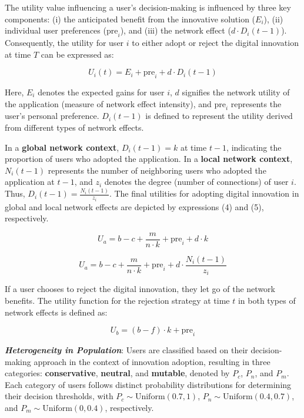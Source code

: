 \documentclass{article} %
\begin{document}
The utility value influencing a user’s decision-making is influenced by three key components: (i) the anticipated benefit from the innovative solution (\( E_i \)), (ii) individual user preferences (\( \text{pre}_i \)), and (iii) the network effect (\(d \cdot D_i(t - 1) \)). Consequently, the utility for user \( i \) to either adopt or reject the digital innovation at time \( T \) can be expressed as:

\begin{equation}
U_i(t) = E_i + \text{pre}_i + d \cdot D_i(t - 1)
\end{equation}

Here, \( E_i \) denotes the expected gains for user \( i \), \( d \) signifies the network utility of the application (measure of network effect intensity), and \( \text{pre}_i \) represents the user's personal preference. \( D_i(t - 1) \) is defined to represent the utility derived from different types of network effects. 

In a \textbf{global network context}, \( D_i(t - 1) = k \) at time \( t - 1 \), indicating the proportion of users who adopted the application. In a \textbf{local network context}, \( N_i(t - 1) \) represents the number of neighboring users who adopted the application at \( t - 1 \), and \( z_i \) denotes the degree (number of connections) of user \( i \). Thus, \( D_i(t - 1) = \frac{N_i(t - 1)}{z_i} \). The final utilities for adopting digital innovation in global and local network effects are depicted by expressions (4) and (5), respectively. 

\begin{equation}
U_a = b - c + \frac{m}{n \cdot k} + \text{pre}_i + d \cdot k
\end{equation}

\begin{equation}
U_a = b - c + \frac{m}{n \cdot k} + \text{pre}_i + d \cdot \frac{N_i(t - 1)}{z_i}
\end{equation}

If a user chooses to reject the digital innovation, they let go of the network benefits. The utility function for the rejection strategy at time \( t \) in both types of network effects is defined as:

\begin{equation}
U_b = (b - f) \cdot k + \text{pre}_i
\end{equation}

\textit{\textbf{Heterogeneity in Population}}: Users are classified based on their decision-making approach in the context of innovation adoption, resulting in three categories: \textbf{conservative}, \textbf{neutral}, and \textbf{mutable}, denoted by \( P_c \), \( P_n \), and \( P_m \). Each category of users follows distinct probability distributions for determining their decision thresholds, with \( P_c \sim \text{Uniform}(0.7, 1) \), \( P_n \sim \text{Uniform}(0.4, 0.7) \), and \( P_m \sim \text{Uniform}(0, 0.4) \), respectively.
\end{document}
